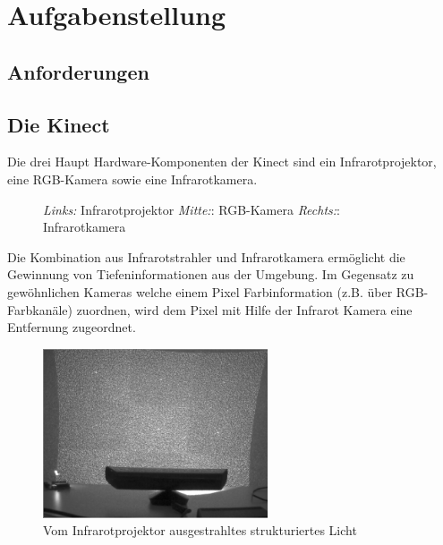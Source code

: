 \chapter{Aufgabenstellung}


\section{Anforderungen}
\section{Die Kinect}
Die drei Haupt Hardware-Komponenten der Kinect sind ein Infrarotprojektor, eine RGB-Kamera sowie eine Infrarotkamera.


\begin{figure}[!ht]
  \centering
   \caption{\emph {Links:} Infrarotprojektor \emph {Mitte:}: RGB-Kamera  \emph {Rechts:}: Infrarotkamera }
\end{figure}

Die Kombination aus Infrarotstrahler und Infrarotkamera ermöglicht die Gewinnung von Tiefeninformationen aus der Umgebung. Im Gegensatz zu gewöhnlichen Kameras welche einem Pixel Farbinformation (z.B.  über RGB-Farbkanäle) zuordnen, wird dem Pixel mit Hilfe der Infrarot Kamera eine Entfernung zugeordnet.

\begin{figure}
  \vspace{-20pt}
  \begin{center}
        \includegraphics[height=5cm]{Res/Kinect_9Points.png}
  \end{center}
  \vspace{-20pt}
  \caption{Vom Infrarotprojektor ausgestrahltes strukturiertes Licht }
  \vspace{-10pt}
\end{figure}

